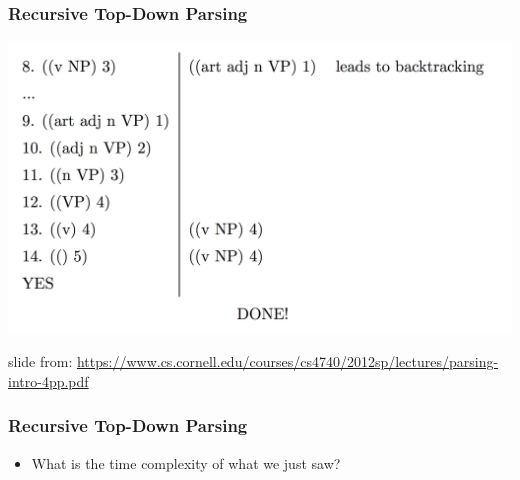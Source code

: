 \documentclass{beamer}
\begin{document}
\begin{frame}
\frametitle{Recursive Top-Down Parsing}
\includegraphics[width=\textwidth]{figures/top5}

{\tiny slide from: \url{https://www.cs.cornell.edu/courses/cs4740/2012sp/lectures/parsing-intro-4pp.pdf}}

\end{frame}

\begin{frame}
\frametitle{Recursive Top-Down Parsing}

\begin{itemize}
\item What is the time complexity of what we just saw?
\end{itemize}
\end{frame}
\end{document}
